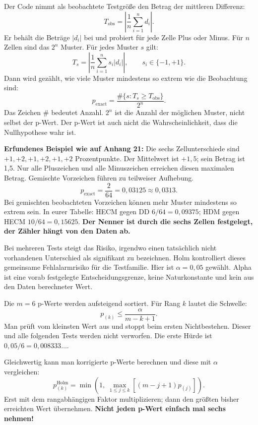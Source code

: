 Der Code nimmt als beobachtete Testgröße den Betrag der mittleren Differenz:
\[
T_{\mathrm{obs}}=\left|\frac1n\sum_{i=1}^{n}d_i\right|.
\]
Er behält die Beträge $|d_i|$ bei und probiert für jede Zelle Plus oder Minus. Für $n$ Zellen sind das $2^n$ Muster. Für jedes Muster $s$ gilt:
\[
T_s=\left|\frac1n\sum_{i=1}^{n}s_i|d_i|\right|,
\qquad s_i\in\{-1,+1\}.
\]
Dann wird gezählt, wie viele Muster mindestens so extrem wie die Beobachtung sind:
\[
\boxed{p_{\mathrm{exact}}=
\frac{\#\{s:T_s\geq T_{\mathrm{obs}}\}}{2^n}}.
\]
Das Zeichen $\#$ bedeutet Anzahl. $2^n$ ist die Anzahl der möglichen Muster, nicht selbst der p-Wert. Der p-Wert ist auch nicht die Wahrscheinlichkeit, dass die Nullhypothese wahr ist.

\textbf{Erfundenes Beispiel wie auf Anhang 21:} Die sechs Zellunterschiede sind $+1,+2,+1,+2,+1,+2$ Prozentpunkte. Der Mittelwert ist $+1{,}5$; sein Betrag ist 1,5. Nur alle Pluszeichen und alle Minuszeichen erreichen diesen maximalen Betrag. Gemischte Vorzeichen führen zu teilweiser Aufhebung.
\[
p_{\mathrm{exact}}=\frac2{64}=0{,}03125\approx0{,}0313.
\]
Bei gemischten beobachteten Vorzeichen können mehr Muster mindestens so extrem sein. In eurer Tabelle: HECM gegen DD $6/64=0{,}09375$; HDM gegen HECM $10/64=0{,}15625$. \textbf{Der Nenner ist durch die sechs Zellen festgelegt, der Zähler hängt von den Daten ab.}

Bei mehreren Tests steigt das Risiko, irgendwo einen tatsächlich nicht vorhandenen Unterschied als signifikant zu bezeichnen. Holm kontrolliert dieses gemeinsame Fehlalarmrisiko für die Testfamilie. Hier ist $\alpha=0{,}05$ gewählt. Alpha ist eine vorab festgelegte Entscheidungsgrenze, keine Naturkonstante und kein aus den Daten berechneter Wert.

Die $m=6$ p-Werte werden aufsteigend sortiert. Für Rang $k$ lautet die Schwelle:
\[
p_{(k)}\leq\frac{\alpha}{m-k+1}.
\]
Man prüft vom kleinsten Wert aus und stoppt beim ersten Nichtbestehen. Dieser und alle folgenden Tests werden nicht verworfen. Die erste Hürde ist $0{,}05/6=0{,}008333\ldots$.

Gleichwertig kann man korrigierte p-Werte berechnen und diese mit $\alpha$ vergleichen:
\[
p^{\mathrm{Holm}}_{(k)}=
\min\left(1,\;\max_{1\leq j\leq k}[(m-j+1)p_{(j)}]\right).
\]
Erst mit dem rangabhängigen Faktor multiplizieren; dann den größten bisher erreichten Wert übernehmen. \textbf{Nicht jeden p-Wert einfach mal sechs nehmen!}

